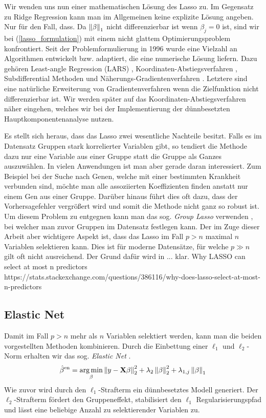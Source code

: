 Wir wenden uns nun einer mathematischen Lösung des Lasso zu. Im Gegensatz zu Ridge Regression kann man im Allgemeinen keine explizite Lösung angeben. Nur für den Fall, dass.
Da $\left\lVert \beta \right\rVert_1$ nicht differenzierbar ist wenn $\beta_j = 0$ ist, sind wir bei (\ref{lasso_formulation}) mit einem nicht glattem Optimierungsproblem konfrontiert. Seit der Problemformulierung in 1996 wurde eine Vielzahl an Algorithmen entwickelt bzw. adaptiert, die eine numerische Lösung liefern. Dazu gehören Least-angle Regression (LARS) \cite{efron_lars}, Koordinaten-Abstiegsverfahren \cite{friedman}, Subdifferential Methoden und  Näherungs-Gradientenverfahren \cite{yang, vandenberghe}. Letztere sind eine natürliche Erweiterung von Gradientenverfahren wenn die Zielfunktion nicht differenzierbar ist. Wir werden später auf das Koordinaten-Abstiegsverfahren näher eingehen, welches wir bei der Implementierung der dünnbesetzten Hauptkomponentenanalyse nutzen.

Es stellt sich heraus, dass das Lasso zwei wesentliche Nachteile besitzt. Falls es im Datensatz Gruppen stark korrelierter Variablen gibt, so tendiert die Methode dazu nur eine Variable aus einer Gruppe statt die Gruppe als Ganzes auszuwählen. In vielen Anwendungen ist man aber gerade daran interessiert. Zum Beispiel bei der Suche nach Genen, welche mit einer bestimmten Krankheit verbunden sind, möchte man alle assoziierten Koeffizienten finden anstatt nur einem Gen aus einer Gruppe. Darüber hinaus führt dies oft dazu, dass der Vorhersagefehler vergrößert wird und somit die Methode nicht ganz so robust ist. Um diesem Problem zu entgegnen kann man das sog. \textit{Group Lasso} verwenden \cite{yuan}, bei welcher man zuvor Gruppen im Datensatz festlegen kann. Der im Zuge dieser Arbeit aber wichtigere Aspekt ist, dass das Lasso im Fall $p > n$ maximal $n$ Variablen selektieren kann. Dies ist für moderne Datensätze, für welche $p \gg n$ gilt oft nicht ausreichend. Der Grund dafür wird in ... klar. Why LASSO can select at most n predictors https://stats.stackexchange.com/questions/386116/why-does-lasso-select-at-most-n-predictors\\

\subsection{Elastic Net}

Damit im Fall $p > n$ mehr als $n$ Variablen selektiert werden, kann man die beiden vorgestellten Methoden kombinieren. Durch die Einbettung einer $\ell_1$ und $\ell_2$-Norm erhalten wir das sog. \textit{Elastic Net} \cite{zou_elasticnet}.
\begin{align}
\label{elastic_net}
\hat{\beta}^{\text{en}} = \operatorname*{arg\,min}_{\beta} \left\lVert y - \mathbf{X} \beta \right\rVert_2^2 + \lambda_2 \left\lVert \beta \right\rVert_{2}^{2} + \lambda_{1,j} \left\lVert \beta \right\rVert_{1}
\end{align}
Wie zuvor wird durch den $\ell_1$-Strafterm ein dünnbesetztes Modell generiert. Der $\ell_2$-Strafterm fördert den Gruppeneffekt, stabilisiert den $\ell_1$ Regularisierungspfad und lässt eine beliebige Anzahl zu selektierender Variablen zu.


